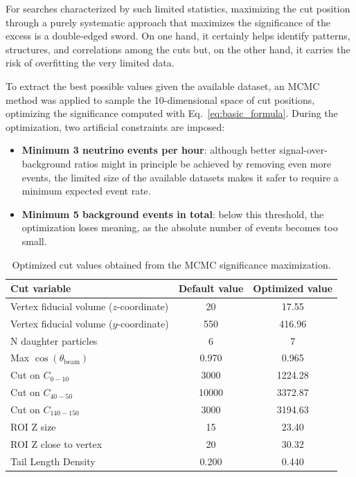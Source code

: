 

For searches characterized by such limited statistics, maximizing the cut position through a purely systematic approach that maximizes the significance of the excess is a double-edged sword. On one hand, it certainly helps identify patterns, structures, and correlations among the cuts but, on the other hand, it carries the risk of overfitting the very limited data.

To extract the best possible values given the available dataset, an MCMC method was applied to sample the 10-dimensional space of cut positions, optimizing the significance computed with Eq.~\ref{eq:basic_formula}. During the optimization, two artificial constraints are imposed:
\begin{itemize}
\item \textbf{Minimum 3 neutrino events per hour}: although better signal-over-background ratios might in principle be achieved by removing even more events, the limited size of the available datasets makes it safer to require a minimum expected event rate.
\item \textbf{Minimum 5 background events in total}: below this threshold, the optimization loses meaning, as the absolute number of events becomes too small.
\end{itemize}
\begin{table}[htbp]
    \centering
    \begin{tabular}{lcc}
        \hline
        Cut variable & Default value & Optimized value \\
        \hline
        Vertex fiducial volume ($z$-coordinate)   & 20      & 17.55   \\
        Vertex fiducial volume ($y$-coordinate)   & 550     & 416.96  \\
        N daughter particles                      & 6       & 7    \\
        Max $\cos(\theta_{\mathrm{beam}})$         & 0.970   & 0.965   \\
        Cut on $C_{0-10}$                          & 3000    & 1224.28 \\
        Cut on $C_{40-50}$                          & 10000   & 3372.87 \\
        Cut on $C_{140-150}$                        & 3000    & 3194.63 \\
        ROI Z size                                 & 15      & 23.40   \\
        ROI Z close to vertex                      & 20      & 30.32   \\
        Tail Length Density                        & 0.200   & 0.440   \\
        \hline
    \end{tabular}
    \caption{Optimized cut values obtained from the MCMC significance maximization.}
    \label{tab:best_parameters_v1}
\end{table}

